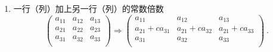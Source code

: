 \begin{enumerate}
\item 一行（列）加上另一行（列）的常数倍数
\begin{equation}
\begin{pmatrix}
        a_{11} & a_{12} & a_{13}\\
        a_{21} & a_{22} & a_{23}\\
        a_{31} & a_{32} & a_{33}\\
\end{pmatrix}
\Rightarrow
\begin{pmatrix}
        a_{11} & a_{12} & a_{13}\\
        a_{21}+ca_{31} & a_{21}+ca_{32} & a_{21}+ca_{33}\\
        a_{31} & a_{32} & a_{33}\\
\end{pmatrix}~.
\end{equation}
\end{enumerate}

